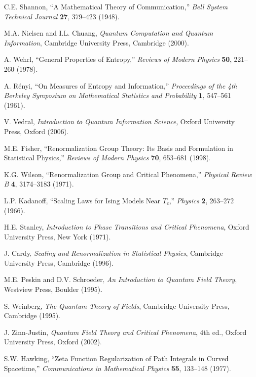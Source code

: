 \documentclass[11pt]{article}
\theoremstyle{plain}
\theoremstyle{definition}
\theoremstyle{remark}
\begin{document}
\begin{thebibliography}{99}
 C.E. Shannon, ``A Mathematical Theory of Communication,'' \emph{Bell System Technical Journal} \textbf{27}, 379--423 (1948).

 M.A. Nielsen and I.L. Chuang, \emph{Quantum Computation and Quantum Information}, Cambridge University Press, Cambridge (2000).

 A. Wehrl, ``General Properties of Entropy,'' \emph{Reviews of Modern Physics} \textbf{50}, 221--260 (1978).

 A. Rényi, ``On Measures of Entropy and Information,'' \emph{Proceedings of the 4th Berkeley Symposium on Mathematical Statistics and Probability} \textbf{1}, 547--561 (1961).

 V. Vedral, \emph{Introduction to Quantum Information Science}, Oxford University Press, Oxford (2006).

 M.E. Fisher, ``Renormalization Group Theory: Its Basis and Formulation in Statistical Physics,'' \emph{Reviews of Modern Physics} \textbf{70}, 653--681 (1998).

 K.G. Wilson, ``Renormalization Group and Critical Phenomena,'' \emph{Physical Review B} \textbf{4}, 3174--3183 (1971).

 L.P. Kadanoff, ``Scaling Laws for Ising Models Near $T_c$,'' \emph{Physics} \textbf{2}, 263--272 (1966).

 H.E. Stanley, \emph{Introduction to Phase Transitions and Critical Phenomena}, Oxford University Press, New York (1971).

 J. Cardy, \emph{Scaling and Renormalization in Statistical Physics}, Cambridge University Press, Cambridge (1996).

 M.E. Peskin and D.V. Schroeder, \emph{An Introduction to Quantum Field Theory}, Westview Press, Boulder (1995).

 S. Weinberg, \emph{The Quantum Theory of Fields}, Cambridge University Press, Cambridge (1995).

 J. Zinn-Justin, \emph{Quantum Field Theory and Critical Phenomena}, 4th ed., Oxford University Press, Oxford (2002).

 S.W. Hawking, ``Zeta Function Regularization of Path Integrals in Curved Spacetime,'' \emph{Communications in Mathematical Physics} \textbf{55}, 133--148 (1977).


\end{thebibliography}
\end{document}
